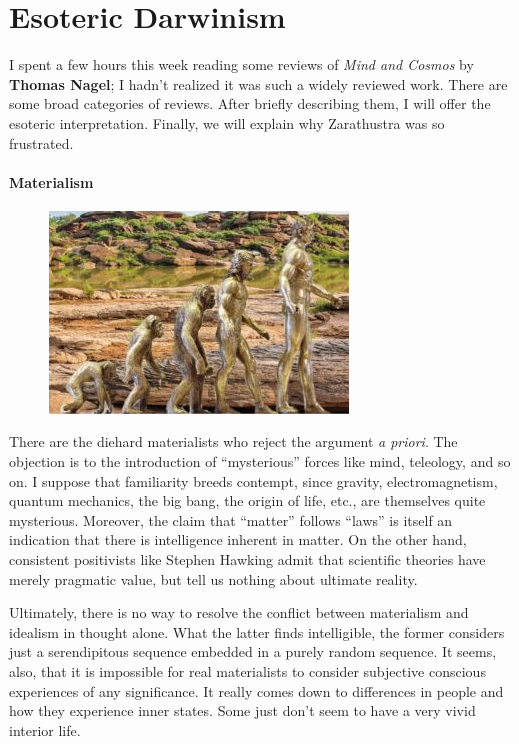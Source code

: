 \section{Esoteric Darwinism}

I spent a few hours this week reading some reviews of \emph{Mind and Cosmos} by \textbf{Thomas Nagel}; I
hadn't realized it was such a widely reviewed work. There are some broad categories of reviews. After
briefly describing them, I will offer the esoteric interpretation. Finally, we will explain why Zarathustra was so
frustrated.

\paragraph{Materialism}
\begin{figure}
 \includegraphics[scale=.5]{a20151116EsotericDarwinism-img001.jpg} 
\end{figure}

There are the diehard materialists who reject the argument \emph{a priori}. The objection is to the introduction of
“mysterious” forces like mind, teleology, and so on. I suppose that familiarity breeds contempt, since gravity,
electromagnetism, quantum mechanics, the big bang, the origin of life, etc., are themselves quite mysterious. Moreover,
the claim that “matter” follows “laws” is itself an indication that there is intelligence inherent in matter. On the
other hand, consistent positivists like Stephen Hawking admit that scientific theories have merely pragmatic value, but
tell us nothing about ultimate reality.

Ultimately, there is no way to resolve the conflict between materialism and idealism in thought alone. What the latter
finds intelligible, the former considers just a serendipitous sequence embedded in a purely random sequence. It seems,
also, that it is impossible for real materialists to consider subjective conscious experiences of any significance. It
really comes down to differences in people and how they experience inner states. Some just don't seem to
have a very vivid interior life.

